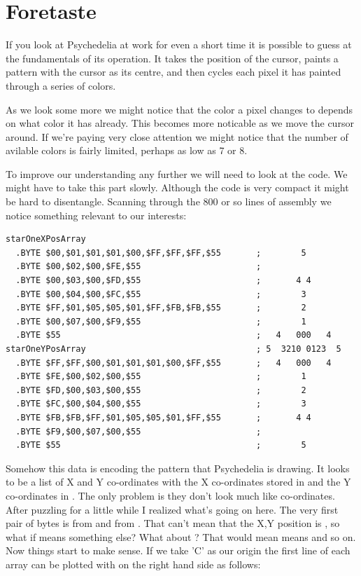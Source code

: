\chapter{Foretaste} 
\lstset{style=6502Style}

If you look at Psychedelia at work for even a short time it is possible to guess at the fundamentals
of its operation. It takes the position of the cursor, paints a pattern with the cursor as its centre,
and then cycles each pixel it has painted through a series of colors.

As we look some more we might notice that the color a pixel changes to depends on what color it has already.
This becomes more noticable as we move the cursor around. If we're paying very close attention we might notice
that the number of avilable colors is fairly limited, perhaps as low as 7 or 8.

To improve our understanding any further we will need to look at the code. We might have to take this part slowly.
Although the code is very compact it might be hard to disentangle. Scanning through the 800 or so lines of assembly
we notice something relevant to our interests:

\begin{lstlisting}[caption=Source code for the Star.]
starOneXPosArray  
  .BYTE $00,$01,$01,$01,$00,$FF,$FF,$FF,$55       ;        5       
  .BYTE $00,$02,$00,$FE,$55                       ;                
  .BYTE $00,$03,$00,$FD,$55                       ;       4 4      
  .BYTE $00,$04,$00,$FC,$55                       ;        3       
  .BYTE $FF,$01,$05,$05,$01,$FF,$FB,$FB,$55       ;        2       
  .BYTE $00,$07,$00,$F9,$55                       ;        1       
  .BYTE $55                                       ;   4   000   4  
starOneYPosArray                                  ; 5  3210 0123  5  
  .BYTE $FF,$FF,$00,$01,$01,$01,$00,$FF,$55       ;   4   000   4  
  .BYTE $FE,$00,$02,$00,$55                       ;        1       
  .BYTE $FD,$00,$03,$00,$55                       ;        2       
  .BYTE $FC,$00,$04,$00,$55                       ;        3       
  .BYTE $FB,$FB,$FF,$01,$05,$05,$01,$FF,$55       ;       4 4      
  .BYTE $F9,$00,$07,$00,$55                       ;                
  .BYTE $55                                       ;        5       
\end{lstlisting}

Somehow this data is encoding the pattern that Psychedelia is drawing. It looks to be a list of X and Y 
co-ordinates with the X co-ordinates stored in  and the Y co-ordinates in
. The only problem is they don't look much like co-ordinates. After puzzling 
for a little while I realized what's going on here. The very first pair of bytes is  from
 and  from . That can't mean that the X,Y
position is , so what if  means something else? What about ? That
would mean  means  and so on. Now things start to make sense. If we take 'C' as our origin the first line of 
each array can be plotted with  on the right hand side as follows:


